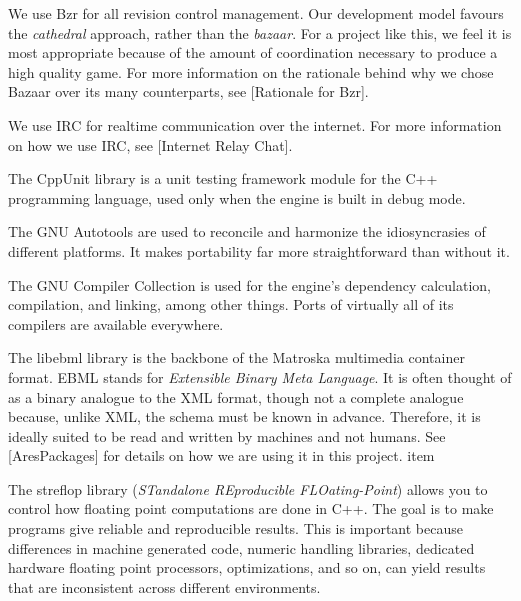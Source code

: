 
\startitemize[4]

We use Bzr for all revision control management. Our development model favours the {\it cathedral} approach, rather than the {\it bazaar}. For a project like this, we feel it is most appropriate because of the amount of coordination necessary to produce a high quality game. For more information on the rationale behind why we chose Bazaar over its many counterparts, see [Rationale for Bzr].


We use IRC for realtime communication over the internet. For more information on how we use IRC, see [Internet Relay Chat].
\stopitemize


\startitemize[4]

The CppUnit library is a unit testing framework module for the C++ programming language, used only when the engine is built in debug mode.


The GNU Autotools are used to reconcile and harmonize the idiosyncrasies of different platforms. It makes portability far more straightforward than without it.


The GNU Compiler Collection is used for the engine's dependency calculation, compilation, and linking, among other things. Ports of virtually all of its compilers are available everywhere.


The libebml library is the backbone of the Matroska multimedia container format. EBML stands for {\it Extensible Binary Meta Language}. It is often thought of as a binary analogue to the XML format, though not a complete analogue because, unlike XML, the schema must be known in advance. Therefore, it is ideally suited to be read and written by machines and not humans. See [AresPackages] for details on how we are using it in this project.
item


The streflop library ({\it STandalone REproducible FLOating-Point}) allows you to control how floating point computations are done in C++. The goal is to make programs give reliable and reproducible results. This is important because differences in machine generated code, numeric handling libraries, dedicated hardware floating point processors, optimizations, and so on, can yield results that are inconsistent across different environments.

